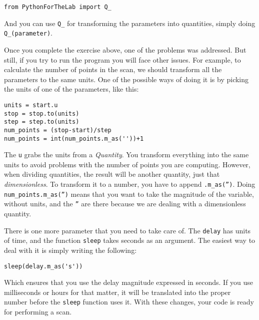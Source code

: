 {\begin{verbatim}
from PythonForTheLab import Q_
\end{verbatim}

And you can use \texttt{Q_} for transforming the parameters into quantities, simply doing \texttt{Q_(parameter)}.


Once you complete the exercise above, one of the problems was addressed. But still, if you try to run the program you will face other issues. For example, to calculate the number of points in the scan, we should transform all the parameters to the same units. One of the possible ways of doing it is by picking the units of one of the parameters, like this:

\begin{verbatim}
units = start.u
stop = stop.to(units)
step = step.to(units)
num_points = (stop-start)/step
num_points = int(num_points.m_as(''))+1
\end{verbatim}

The \texttt{u} grabs the units from a \emph{Quantity}. You transform everything into the same units to avoid problems with the number of points you are computing. However, when dividing quantities, the result will be another quantity, just that \emph{dimensionless}. To transform it to a number, you have to append \texttt{.m_as('')}. Doing \texttt{num_points.m_as('')} means that you want to take the magnitude of the variable, without units, and the \texttt{''} are there because we are dealing with a dimensionless quantity. 


There is one more parameter that you need to take care of. The \texttt{delay} has units of time, and the function \texttt{sleep} takes seconds as an argument. The easiest way to deal with it is simply writing the following:

\begin{verbatim}
sleep(delay.m_as('s'))
\end{verbatim}

Which ensures that you use the delay magnitude expressed in seconds.  If you use milliseconds or hours for that matter, it will be translated into the proper number before the \texttt{sleep} function uses it. With these changes, your code is ready for performing a scan. 

}
